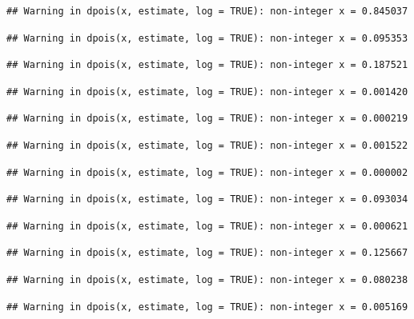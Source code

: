 \documentclass[]{article}
\begin{document}
\begin{verbatim}
## Warning in dpois(x, estimate, log = TRUE): non-integer x = 0.845037
\end{verbatim}

\begin{verbatim}
## Warning in dpois(x, estimate, log = TRUE): non-integer x = 0.095353
\end{verbatim}

\begin{verbatim}
## Warning in dpois(x, estimate, log = TRUE): non-integer x = 0.187521
\end{verbatim}

\begin{verbatim}
## Warning in dpois(x, estimate, log = TRUE): non-integer x = 0.001420
\end{verbatim}

\begin{verbatim}
## Warning in dpois(x, estimate, log = TRUE): non-integer x = 0.000219
\end{verbatim}

\begin{verbatim}
## Warning in dpois(x, estimate, log = TRUE): non-integer x = 0.001522
\end{verbatim}

\begin{verbatim}
## Warning in dpois(x, estimate, log = TRUE): non-integer x = 0.000002
\end{verbatim}

\begin{verbatim}
## Warning in dpois(x, estimate, log = TRUE): non-integer x = 0.093034
\end{verbatim}

\begin{verbatim}
## Warning in dpois(x, estimate, log = TRUE): non-integer x = 0.000621
\end{verbatim}

\begin{verbatim}
## Warning in dpois(x, estimate, log = TRUE): non-integer x = 0.125667
\end{verbatim}

\begin{verbatim}
## Warning in dpois(x, estimate, log = TRUE): non-integer x = 0.080238
\end{verbatim}

\begin{verbatim}
## Warning in dpois(x, estimate, log = TRUE): non-integer x = 0.005169
\end{verbatim}
\end{document}
